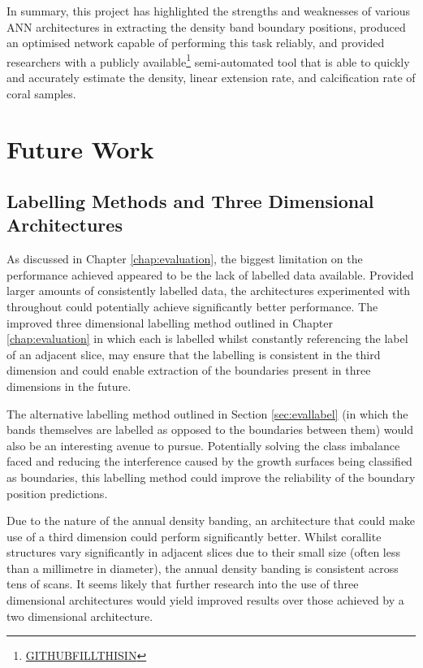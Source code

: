 In summary, this project has highlighted the strengths and weaknesses of various ANN architectures in extracting the density band boundary positions, produced an optimised network capable of performing this task reliably, and provided researchers with a publicly available\footnote{\url{GITHUBFILLTHISIN}} semi-automated tool that is able to quickly and accurately estimate the density, linear extension rate, and calcification rate of coral samples.

\section{Future Work}

\subsection{Labelling Methods and Three Dimensional Architectures}

As discussed in Chapter \ref{chap:evaluation}, the biggest limitation on the performance achieved appeared to be the lack of labelled data available. Provided larger amounts of consistently labelled data, the architectures experimented with throughout could potentially achieve significantly better performance. The improved three dimensional labelling method outlined in Chapter \ref{chap:evaluation} in which each is labelled whilst constantly referencing the label of an adjacent slice, may ensure that the labelling is consistent in the third dimension and could enable extraction of the boundaries present in three dimensions in the future.

The alternative labelling method outlined in Section \ref{sec:evallabel} (in which the bands themselves are labelled as opposed to the boundaries between them) would also be an interesting avenue to pursue. Potentially solving the class imbalance faced and reducing the interference caused by the growth surfaces being classified as boundaries, this labelling method could improve the reliability of the boundary position predictions.

Due to the nature of the annual density banding, an architecture that could make use of a third dimension could perform significantly better. Whilst corallite structures vary significantly in adjacent slices due to their small size (often less than a millimetre in diameter), the annual density banding is consistent across tens of scans. It seems likely that further research into the use of three dimensional architectures would yield improved results over those achieved by a two dimensional architecture.

